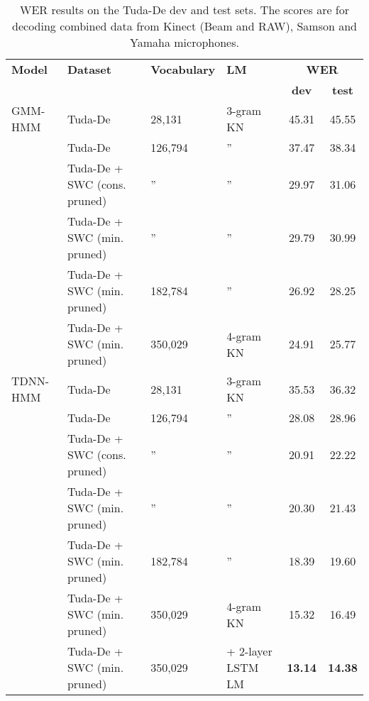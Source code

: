 \documentclass[a4paper]{article}
\begin{document}
\begin{table*}[t]
  \centering
  \begin{tabular}{llllcc}
    \toprule
\textbf{Model} &    \textbf{Dataset} &    \textbf{Vocabulary} &    \textbf{LM} &  \multicolumn{2}{c}{\textbf{WER}} \\ 
               &                   &                   &                   & \textbf{dev} & \textbf{test} \\  
    \midrule
    GMM-HMM
               & Tuda-De &  28,131 & 3-gram KN  & 45.31 & 45.55 \\
               & Tuda-De & 126,794 & '' & 37.47 & 38.34 \\
               & Tuda-De + SWC (cons. pruned) & '' & '' & 29.97 & 31.06 \\
               & Tuda-De + SWC (min. pruned) & '' & '' & 29.79 & 30.99 \\
               & Tuda-De + SWC  (min. pruned) & 182,784 & '' & 26.92 & 28.25 \\ & Tuda-De + SWC  (min. pruned) & 350,029 & 4-gram KN & 24.91 & 25.77 \\
    \midrule   
    TDNN-HMM
               & Tuda-De &  28,131 & 3-gram KN &  35.53 & 36.32 \\
               & Tuda-De  &  126,794 & '' & 28.08  & 28.96 \\
               & Tuda-De + SWC (cons. pruned) & '' & '' & 20.91 & 22.22 \\
               & Tuda-De + SWC (min. pruned) & '' & '' & 20.30 & 21.43 \\
               & Tuda-De + SWC (min. pruned) & 182,784 & '' & 18.39 & 19.60 \\
               & Tuda-De + SWC (min. pruned) & 350,029 & 4-gram KN & 15.32 & 16.49 \\
               & Tuda-De + SWC (min. pruned) & 350,029 & + 2-layer LSTM LM & \textbf{13.14} & \textbf{14.38} \\

    \bottomrule
  \end{tabular}
  \caption{WER results on the Tuda-De dev and test sets. The scores are for decoding combined data from Kinect (Beam and RAW), Samson and Yamaha microphones.}
  \label{tab:mainresults}
\end{table*}
\end{document}
